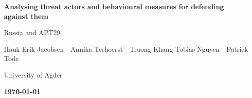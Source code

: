 \documentclass[a4paper,12pt,twocolumn]{article}
\begin{document}
\begin{titlepage}
    \centering

    \vspace*{4cm}

    {\LARGE\bfseries Analysing threat actors and behavioural measures for defending against them\par}

    \vspace{0.5cm}

    {\large Russia and APT29\par}

    \vfill

    {Hauk Erik Jacobsen - Annika Terhoerst - Truong Khang Tobias Nguyen - Patrick Tode\par}


    \vspace{1cm}

    {\large University of Agder\par}

    \vspace{0.5cm}

    {\large \textbf{\today}\par}

\end{titlepage}






\printbibliography[]


\end{document}
